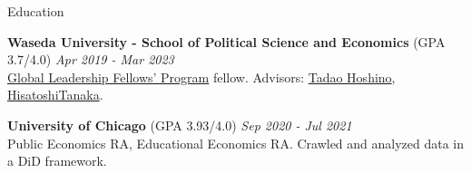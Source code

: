 \documentclass{resume} %
\begin{document}
\begin{rSection}{Education}

{\bf Waseda University - School of Political Science and Economics }(GPA 3.7/4.0) \hfill {\em Apr 2019 - Mar 2023} 
\\\href{http://www2.cie-waseda.jp/glfp/jp/about/program.html}{Global Leadership Fellows' Program} fellow. Advisors: \href{https://tadaohoshino.wordpress.com/}{Tadao Hoshino}, \href{https://waseda.pure.elsevier.com/en/persons/hisatoshi-tanaka}{HisatoshiTanaka}.

{\bf University of Chicago }(GPA 3.93/4.0) \hfill {\em Sep 2020 - Jul 2021} 
\\Public Economics RA, Educational Economics RA. Crawled and analyzed data in a DiD framework. 

%


\end{rSection}

\end{document}
